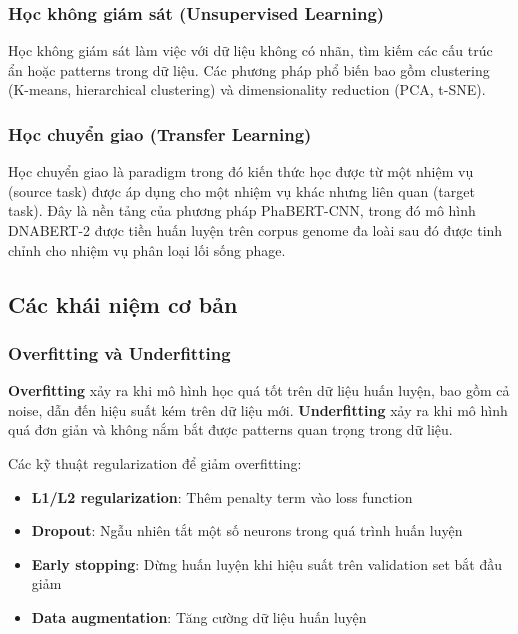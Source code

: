 \subsubsection{Học không giám sát (Unsupervised Learning)}

Học không giám sát làm việc với dữ liệu không có nhãn, tìm kiếm các cấu trúc ẩn hoặc patterns trong dữ liệu. Các phương pháp phổ biến bao gồm clustering (K-means, hierarchical clustering) và dimensionality reduction (PCA, t-SNE).

\subsubsection{Học chuyển giao (Transfer Learning)}

Học chuyển giao là paradigm trong đó kiến thức học được từ một nhiệm vụ (source task) được áp dụng cho một nhiệm vụ khác nhưng liên quan (target task). Đây là nền tảng của phương pháp PhaBERT-CNN, trong đó mô hình DNABERT-2 được tiền huấn luyện trên corpus genome đa loài sau đó được tinh chỉnh cho nhiệm vụ phân loại lối sống phage.

\subsection{Các khái niệm cơ bản}

\subsubsection{Overfitting và Underfitting}

\textbf{Overfitting} xảy ra khi mô hình học quá tốt trên dữ liệu huấn luyện, bao gồm cả noise, dẫn đến hiệu suất kém trên dữ liệu mới. \textbf{Underfitting} xảy ra khi mô hình quá đơn giản và không nắm bắt được patterns quan trọng trong dữ liệu.

Các kỹ thuật regularization để giảm overfitting:
\begin{itemize}
    \item \textbf{L1/L2 regularization}: Thêm penalty term vào loss function
    \item \textbf{Dropout}: Ngẫu nhiên tắt một số neurons trong quá trình huấn luyện
    \item \textbf{Early stopping}: Dừng huấn luyện khi hiệu suất trên validation set bắt đầu giảm
    \item \textbf{Data augmentation}: Tăng cường dữ liệu huấn luyện
\end{itemize}

